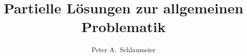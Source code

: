 \documentclass[master,german]{hgbthesis}
\title{Partielle Lösungen zur allgemeinen Problematik}
\author{Peter A.\ Schlaumeier}
\begin{document}

\frontmatter                    %

\maketitle
\tableofcontents

		
			

\mainmatter          %










\appendix                                            %


\MakeBibliography                        %



\end{document}

